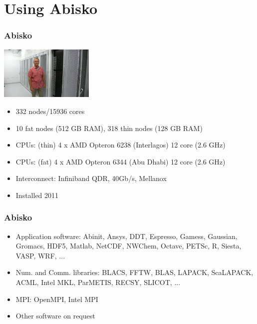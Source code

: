 %

\section{Using Abisko}

\begin{frame}
	\frametitle{Abisko}
\includegraphics[width=4.5cm]{images/abisko.jpg}
	\begin{itemize}
		\item	332 nodes/15936 cores
		\item	10 fat nodes (512 GB RAM), 318 thin nodes (128 GB RAM)
		\item	CPUs: (thin) 4 x AMD Opteron 6238 (Interlagos) 12 core (2.6 GHz)
		\item	CPUs: (fat) 4 x AMD Opteron 6344 (Abu Dhabi) 12 core (2.6 GHz)
		\item	Interconnect: Infiniband QDR, 40Gb/s, Mellanox
		\item	Installed 2011
	\end{itemize}
\end{frame}

\begin{frame}
	\frametitle{Abisko}
	\begin{itemize}
		\item	Application software: Abinit, Ansys, DDT, Espresso,
				Gamess, Gaussian, Gromacs, HDF5, Matlab, NetCDF,
				NWChem, Octave, PETSc, R, Siesta, VASP, WRF, ...
		\item	Num. and Comm. libraries: BLACS, FFTW, BLAS, LAPACK,
				ScaLAPACK, ACML, Intel MKL, ParMETIS, RECSY, SLICOT, ...
		\item	MPI: OpenMPI, Intel MPI
		\item	Other software on request
	\end{itemize}
\end{frame}


